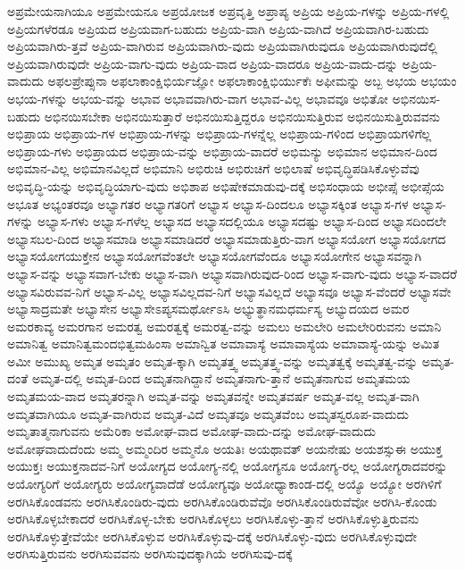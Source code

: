 {ಅಪ್ರಮೇಯನಾಗಿಯೂ
ಅಪ್ರಮೇಯನೂ
ಅಪ್ರಯೋಜಕ
ಅಪ್ರವೃತ್ತಿ
ಅಪ್ರಾಪ್ಯ
ಅಪ್ರಿಯ
ಅಪ್ರಿಯ-ಗಳನ್ನು
ಅಪ್ರಿಯ-ಗಳಲ್ಲಿ
ಅಪ್ರಿಯಗಳೆರಡೂ
ಅಪ್ರಿಯದ
ಅಪ್ರಿಯವಾಗ-ಬಹುದು
ಅಪ್ರಿಯ-ವಾಗಿ
ಅಪ್ರಿಯ-ವಾಗಿದೆ
ಅಪ್ರಿಯವಾಗಿರ-ಬಹುದು
ಅಪ್ರಿಯವಾಗಿರು-ತ್ತವೆ
ಅಪ್ರಿಯ-ವಾಗಿರುವ
ಅಪ್ರಿಯವಾಗಿರು-ವುದು
ಅಪ್ರಿಯವಾಗಿರುವುದೂ
ಅಪ್ರಿಯವಾಗಿರುವುದೆಲ್ಲಿ
ಅಪ್ರಿಯವಾಗಿರುವುದೇ
ಅಪ್ರಿಯ-ವಾಗು-ವುದು
ಅಪ್ರಿಯ-ವಾದ
ಅಪ್ರಿಯ-ವಾದರೂ
ಅಪ್ರಿಯ-ವಾದು-ದನ್ನು
ಅಪ್ರಿಯ-ವಾದುದು
ಅಫಲಪ್ರೇಪ್ಸುನಾ
ಅಫಲಾಕಾಂಕ್ಷಿಭಿರ್ಯಜ್ಞೋ
ಅಫಲಾಕಾಂಕ್ಷಿಭಿರ್ಯುಕೆಃ
ಅಫೀಮನ್ನು
ಅಬ್ಬ
ಅಭಯ
ಅಭಯಂ
ಅಭಯ-ಗಳನ್ನು
ಅಭಯ-ವನ್ನು
ಅಭಾವ
ಅಭಾವವಾಗಿರು-ವಾಗ
ಅಭಾವ-ವಿಲ್ಲ
ಅಭಾವವೂ
ಅಭಿತೋ
ಅಭಿನಯಿಸ-ಬಹುದು
ಅಭಿನಯಿಸಬೇಕಾ
ಅಭಿನಯಿಸುತ್ತಾರೆ
ಅಭಿನಯಿಸುತ್ತಿದ್ದರೂ
ಅಭಿನಯಿಸುತ್ತಿರುವ
ಅಭಿನಯಿಸುತ್ತಿರುವವನು
ಅಭಿಪ್ರಾಯ
ಅಭಿಪ್ರಾಯ-ಗಳ
ಅಭಿಪ್ರಾಯ-ಗಳನ್ನು
ಅಭಿಪ್ರಾಯ-ಗಳನ್ನೆಲ್ಲ
ಅಭಿಪ್ರಾಯ-ಗಳಿಂದ
ಅಭಿಪ್ರಾಯಗಳಿಗೆಲ್ಲ
ಅಭಿಪ್ರಾಯ-ಗಳು
ಅಭಿಪ್ರಾಯದ
ಅಭಿಪ್ರಾಯ-ವನ್ನು
ಅಭಿಪ್ರಾಯ-ವಾದರೆ
ಅಭಿಮನ್ಯು
ಅಭಿಮಾನ
ಅಭಿಮಾನ-ದಿಂದ
ಅಭಿಮಾನ-ವಿಲ್ಲ
ಅಭಿಮಾನವಿಲ್ಲದೆ
ಅಭಿಮಾನಿ
ಅಭಿರುಚಿ
ಅಭಿರುಚಿಗೆ
ಅಭಿಲಾಷೆ
ಅಭಿವೃದ್ಧಿಪಡಿಸಿಕೊಳ್ಳುವೆವು
ಅಭಿವೃದ್ಧಿ-ಯನ್ನು
ಅಭಿವೃದ್ಧಿಯಾಗು-ವುದು
ಅಭಿಶಾಪ
ಅಭಿಷೇಕಮಾಡುವು-ದಕ್ಕೆ
ಅಭಿಸಂಧಾಯ
ಅಭೀಪ್ಸೆ
ಅಭೀಪ್ಸೆಯ
ಅಭೂತ
ಅಭ್ಯಂತರವೂ
ಅಭ್ಯಾಗತರ
ಅಭ್ಯಾಗತರಿಗೆ
ಅಭ್ಯಾಸ
ಅಭ್ಯಾಸ-ದಿಂದಲೂ
ಅಭ್ಯಾಸಕ್ಕಿಂತ
ಅಭ್ಯಾಸ-ಗಳ
ಅಭ್ಯಾಸ-ಗಳನ್ನು
ಅಭ್ಯಾಸ-ಗಳು
ಅಭ್ಯಾಸ-ಗಳೆಲ್ಲ
ಅಭ್ಯಾಸದ
ಅಭ್ಯಾಸದಲ್ಲಿಯೂ
ಅಭ್ಯಾಸದಷ್ಟು
ಅಭ್ಯಾಸ-ದಿಂದ
ಅಭ್ಯಾಸದಿಂದಲೇ
ಅಭ್ಯಾಸಬಲ-ದಿಂದ
ಅಭ್ಯಾಸಮಾಡಿ
ಅಭ್ಯಾಸಮಾಡಿದರೆ
ಅಭ್ಯಾಸಮಾಡುತ್ತಿರು-ವಾಗ
ಅಭ್ಯಾಸಯೋಗ
ಅಭ್ಯಾಸಯೋಗದ
ಅಭ್ಯಾಸಯೋಗಯುಕ್ತೇನ
ಅಭ್ಯಾಸಯೋಗವೆಂತಲೇ
ಅಭ್ಯಾಸಯೋಗವೆಂದೂ
ಅಭ್ಯಾಸಯೋಗೇನ
ಅಭ್ಯಾಸವನ್ನಾಗಿ
ಅಭ್ಯಾಸ-ವನ್ನು
ಅಭ್ಯಾಸವಾಗ-ಬೇಕು
ಅಭ್ಯಾಸ-ವಾಗಿ
ಅಭ್ಯಾಸವಾಗಿರುವುದ-ರಿಂದ
ಅಭ್ಯಾಸ-ವಾಗು-ವುದು
ಅಭ್ಯಾಸ-ವಾದರೆ
ಅಭ್ಯಾಸವಿರುವವ-ನಿಗೆ
ಅಭ್ಯಾಸ-ವಿಲ್ಲ
ಅಭ್ಯಾಸವಿಲ್ಲದವ-ನಿಗೆ
ಅಭ್ಯಾಸವಿಲ್ಲದೆ
ಅಭ್ಯಾಸವೂ
ಅಭ್ಯಾಸ-ವೆಂದರೆ
ಅಭ್ಯಾಸವೇ
ಅಭ್ಯಾಸಾದ್ರಮತೇ
ಅಭ್ಯಾಸೇನ
ಅಭ್ಯಾಸೇಽಪ್ಯಸಮರ್ಥೋಽಸಿ
ಅಭ್ಯುತ್ಥಾನಮಧರ್ಮಸ್ಯ
ಅಭ್ಯುದಯದ
ಅಮರ
ಅಮರಕಾವ್ಯ
ಅಮರಗಾನ
ಅಮರತ್ವ
ಅಮರತ್ವಕ್ಕೆ
ಅಮರತ್ವ-ವನ್ನು
ಅಮಲು
ಅಮಲೇರಿ
ಅಮಲೇರಿರುವನು
ಅಮಾನಿ
ಅಮಾನಿತ್ವ
ಅಮಾನಿತ್ವಮಂದಭಿತ್ವಮಹಿಂಸಾ
ಅಮಾನ್ವಿತ
ಅಮಾವಾಸ್ಯೆ
ಅಮಾವಾಸ್ಯೆಯ
ಅಮಾವಾಸ್ಯೆ-ಯನ್ನು
ಅಮಿತ
ಅಮೀ
ಅಮುಖ್ಯ
ಅಮೃತ
ಅಮೃತಂ
ಅಮೃತ-ಕ್ಕಾಗಿ
ಅಮೃತತ್ತ್ವ
ಅಮೃತತ್ತ್ವ-ವನ್ನು
ಅಮೃತತ್ವಕ್ಕೆ
ಅಮೃತತ್ವ-ವನ್ನು
ಅಮೃತ-ದಂತೆ
ಅಮೃತ-ದಲ್ಲಿ
ಅಮೃತ-ದಿಂದ
ಅಮೃತನಾಗಿದ್ದಾನೆ
ಅಮೃತನಾಗು-ತ್ತಾನೆ
ಅಮೃತನಾಗುವ
ಅಮೃತಮಯ
ಅಮೃತಮಯ-ವಾದ
ಅಮೃತರನ್ನಾಗಿ
ಅಮೃತ-ವನ್ನು
ಅಮೃತವನ್ನೇ
ಅಮೃತವರ್ಷ
ಅಮೃತ-ವಲ್ಲ
ಅಮೃತ-ವಾಗಿ
ಅಮೃತವಾಗಿಯೂ
ಅಮೃತ-ವಾಗಿರುವ
ಅಮೃತ-ವಿದೆ
ಅಮೃತವೂ
ಅಮೃತವೆಂಬ
ಅಮೃತಸ್ವರೂಪ-ವಾದುದು
ಅಮೃತಾತ್ಮನಾಗುವನು
ಅಮೆರಿಕಾ
ಅಮೋಘ-ವಾದ
ಅಮೋಘ-ವಾದು-ದನ್ನು
ಅಮೋಘ-ವಾದುದು
ಅಮೋಘವಾದುದೆಂದು
ಅಮ್ಮ
ಅಮ್ಮಂದಿರ
ಅಮ್ಮನೊ
ಅಯತಿಃ
ಅಯಥಾವತ್
ಅಯನೇಷು
ಅಯಶಸ್ಸುಈ
ಅಯುಕ್ತ
ಅಯುಕ್ತಃ
ಅಯುಕ್ತನಾದವ-ನಿಗೆ
ಅಯೋಗ್ಯದ
ಅಯೋಗ್ಯ-ನಲ್ಲಿ
ಅಯೋಗ್ಯನೂ
ಅಯೋಗ್ಯ-ರಲ್ಲ
ಅಯೋಗ್ಯರಾದವರನ್ನು
ಅಯೋಗ್ಯರಿಗೆ
ಅಯೋಗ್ಯರು
ಅಯೋಗ್ಯವಾದೆಡೆ
ಅಯೋಗ್ಯವೂ
ಅಯೋಧ್ಯಾಕಾಂಡ-ದಲ್ಲಿ
ಅಯ್ಯೊ
ಅಯ್ಯೋ
ಅರಗಿಳಿಗೆ
ಅರಗಿಸಿಕೊಂಡವನು
ಅರಗಿಸಿಕೊಂಡಿರು-ವುದು
ಅರಗಿಸಿಕೊಂಡಿರುವೆವೊ
ಅರಗಿಸಿಕೊಂಡಿರುವೆವೋ
ಅರಗಿಸಿ-ಕೊಂಡು
ಅರಗಿಸಿಕೊಳ್ಳಬೇಕಾದರೆ
ಅರಗಿಸಿಕೊಳ್ಳ-ಬೇಕು
ಅರಗಿಸಿಕೊಳ್ಳಲು
ಅರಗಿಸಿಕೊಳ್ಳು-ತ್ತಾನೆ
ಅರಗಿಸಿಕೊಳ್ಳುತ್ತಿರುವನು
ಅರಗಿಸಿಕೊಳ್ಳುತ್ತೇವೆಯೇ
ಅರಗಿಸಿಕೊಳ್ಳುವ
ಅರಗಿಸಿಕೊಳ್ಳುವು-ದಕ್ಕೆ
ಅರಗಿಸಿಕೊಳ್ಳು-ವುದು
ಅರಗಿಸಿಕೊಳ್ಳುವುದೇ
ಅರಗಿಸುತ್ತಿರುವನು
ಅರಗಿಸುವವನು
ಅರಗಿಸುವುದಕ್ಕಾಗಿಯೆ
ಅರಗಿಸುವು-ದಕ್ಕೆ
}
